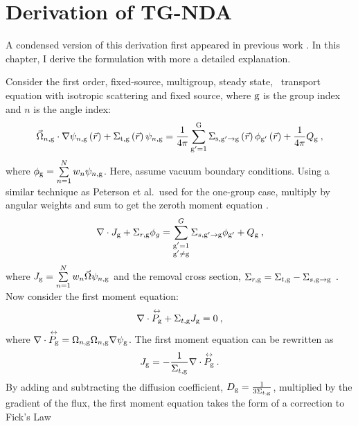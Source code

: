 
\section{Derivation of TG-NDA}
A condensed version of this derivation first appeared in previous work \cite{Ramirez2017}. In this chapter, I derive the formulation with more a detailed explanation.

Consider the first order, fixed-source, multigroup, steady state, \sn\ transport equation with isotropic scattering and fixed source, where $\mathrm{g}$ is the group index and $n$ is the angle index:
  \begin{equation}
  \vec{\Omega}_{n,\mathrm{g}}\cdot \nabla \psi_{n,\mathrm{g}} \left(\vec{r}\right)+ \Sigma_{\mathrm{t},\mathrm{g}}\left(\vec{r}\right)\psi_{n,\mathrm{g}} = \frac{1}{4 \pi} \sum\limits_{\mathrm{g}'=1}^{\mathrm{G}} \Sigma_{\mathrm{s},{\mathrm{g}'}\to\mathrm{g}}\left(\vec{r}\right) \phi_{\mathrm{g}'}\left(\vec{r}\right) + \frac{1}{4 \pi} Q_{\mathrm{g}}\:,
  \end{equation}
where $\phi_{\mathrm{g}} = \sum\limits_{n=1}^N w_n \psi_{n, \mathrm{g}}$. Here, assume vacuum boundary conditions. 
Using a similar technique as Peterson et al.\ used for the one-group case, multiply by angular weights and sum to get the zeroth moment equation \cite{morel-holo}.
%
  \begin{equation}
  \nabla \cdot J_{\mathrm{g}} + \Sigma_{r,\mathrm{g}}\phi_g  = \sum_{\substack{\mathrm{g}'=1 \\ \mathrm{g}' \neq \mathrm{g}}}^G \Sigma_{s,\mathrm{g}' \rightarrow \mathrm{g}}\phi_{\mathrm{g}'} + Q_{\mathrm{g}}\:,
  \label{eq:zeroth_moment}
  \end{equation}
where $J_{\mathrm{g}} = \sum\limits_{n=1}^{N}w_n \vec{\Omega}\psi_{n, \mathrm{g}}$ and the removal cross section, $\Sigma_{r, \mathrm{g}} = \Sigma_{t, \mathrm{g}} - \Sigma_{s, \mathrm{g} \rightarrow \mathrm{g}}$ . 
  Now consider the first moment equation:
  \begin{equation}
  \nabla \cdot \overset{\text{\scriptsize$\leftrightarrow$}}{P_{\mathrm{g}}} + \Sigma_{t, \mathrm{g}} J_{\mathrm{g}} = 0\:,
  \end{equation}
where $\nabla \cdot \overset{\text{\scriptsize$\leftrightarrow$}}{P_{\mathrm{g}}} =  \Omega_{n,\mathrm{g}} \Omega_{n,\mathrm{g}} \nabla \psi_{\mathrm{g}}$. The first moment equation can be rewritten as
%
  \begin{equation}
  J_{\mathrm{g}} = -\frac{1}{\Sigma_{t, \mathrm{g}}} \nabla \cdot \overset{\text{\scriptsize$\leftrightarrow$}}{P_{\mathrm{g}}} \:. 
  \end{equation}
  By adding and subtracting the diffusion coefficient, $D_{\mathrm{g}} = \frac{1}{3\Sigma_{t, \mathrm{g}}}$, multiplied by the gradient of the flux, the first moment equation takes the form of a correction to Fick's Law
